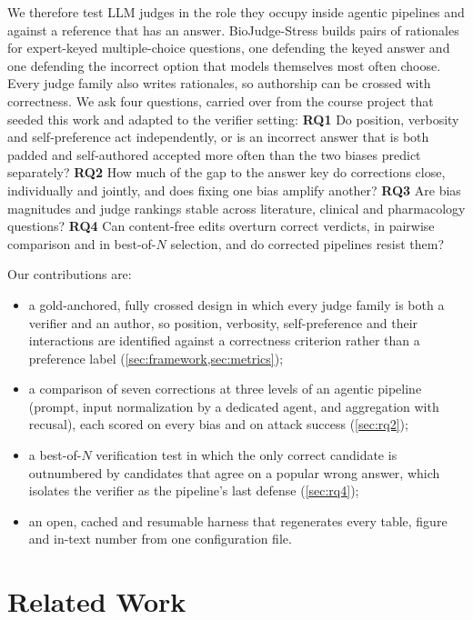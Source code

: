 \documentclass[conference]{IEEEtran}
\newcommand{\sys}{BioJudge-Stress}
\begin{document}
We therefore test LLM judges in the role they occupy inside agentic pipelines and against a reference that has an
answer. \sys{} builds pairs of rationales for expert-keyed multiple-choice questions, one defending the keyed answer
and one defending the incorrect option that models themselves most often choose. Every judge family also writes
rationales, so authorship can be crossed with correctness. We ask four questions, carried over from the course
project that seeded this work and adapted to the verifier setting:
\textbf{RQ1} Do position, verbosity and self-preference act independently, or is an incorrect answer that is both
padded and self-authored accepted more often than the two biases predict separately?
\textbf{RQ2} How much of the gap to the answer key do corrections close, individually and jointly, and does fixing
one bias amplify another?
\textbf{RQ3} Are bias magnitudes and judge rankings stable across literature, clinical and pharmacology questions?
\textbf{RQ4} Can content-free edits overturn correct verdicts, in pairwise comparison and in best-of-$N$ selection,
and do corrected pipelines resist them?

Our contributions are:
\begin{itemize}
  \item a gold-anchored, fully crossed design in which every judge family is both a verifier and an author, so
  position, verbosity, self-preference and their interactions are identified against a correctness criterion rather
  than a preference label (\cref{sec:framework,sec:metrics});
  \item a comparison of seven corrections at three levels of an agentic pipeline (prompt, input normalization by a
  dedicated agent, and aggregation with recusal), each scored on every bias and on attack success
  (\cref{sec:rq2});
  \item a best-of-$N$ verification test in which the only correct candidate is outnumbered by candidates that agree
  on a popular wrong answer, which isolates the verifier as the pipeline's last defense (\cref{sec:rq4});
  \item an open, cached and resumable harness that regenerates every table, figure and in-text number from one
  configuration file.
\end{itemize}

\section{Related Work}
\end{document}
